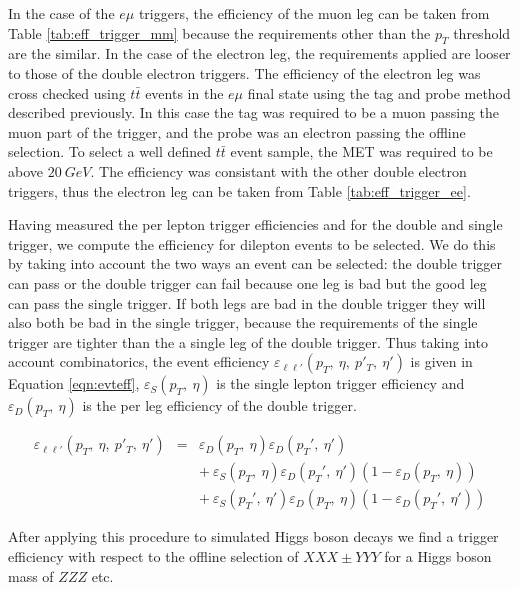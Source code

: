 In the case of the $e\mu$ triggers, the efficiency of the muon leg can be
taken from Table \ref{tab:eff_trigger_mm} because the 
requirements other than the $p_T$ threshold are the similar.
In the case of the electron leg, the requirements applied are looser
to those of the double electron triggers.
The efficiency of the electron leg was cross checked using $t\bar{t}$ 
events in the $e\mu$ final state using the tag
and probe method described previously.
In this case the tag was required to be a muon passing the muon part of the
trigger, and the probe was an electron passing the offline selection.
To select a well defined $t\bar{t}$ event sample, the MET was required to be
above $20~GeV$.
The efficiency was consistant with the other double electron triggers,
thus the electron leg can be taken from 
Table \ref{tab:eff_trigger_ee}.

Having measured the per lepton trigger efficiencies 
and for the double and single trigger,
we compute the efficiency for dilepton events to be selected.
We do this by taking into account the two ways an event can be selected: 
the double trigger can pass or the double trigger can fail because one leg is bad
but the good leg can pass the single trigger.
If both legs are bad in the double trigger they will also both be bad in the single trigger,
because the requirements of the single trigger are tighter than the a single leg of the double trigger.
Thus taking into account combinatorics, the event efficiency $\varepsilon_{\ell\ell'}(p_T,\:\eta,\:p'_T,\:\eta')$
is given in Equation \ref{eqn:evteff}, $\varepsilon_{S}(p_T,\:\eta)$ is the single lepton trigger efficiency and
$\varepsilon_{D}(p_T,\:\eta)$ is the per leg efficiency of the double trigger.

\begin{eqnarray}
\label{eqn:evteff}
\varepsilon_{\ell\ell'}(p_T,\:\eta,\:p'_T,\:\eta') & = & \varepsilon_{D}(p_T,\:\eta) \varepsilon_{D}(p_T',\:\eta') \nonumber\\
               &   & +~\varepsilon_{S}(p_T,\:\eta)\varepsilon_{D}(p_T',\:\eta')(1-\varepsilon_{D}(p_T,\:\eta)) \nonumber\\
               &   & +~\varepsilon_{S}(p_T',\:\eta')\varepsilon_{D}(p_T,\:\eta)(1-\varepsilon_{D}(p_T',\:\eta'))
\end{eqnarray}

After applying this procedure to simulated Higgs boson decays we find a trigger efficiency with
respect to the offline selection of $XXX \pm YYY$ for a Higgs boson mass of $ZZZ$ etc.


